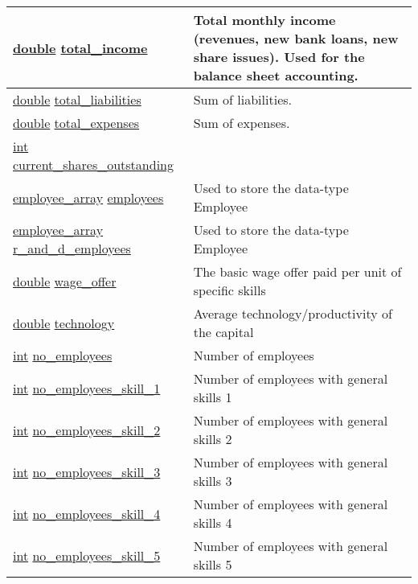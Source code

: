 \documentclass[a4paper,11pt]{article}
\begin{document}
\begin{longtable}[H!]{ll}
\midrule
\parbox{5cm}{\url{double} \url{total_income}}  & \parbox{10cm}{Total monthly income (revenues, new bank loans, new share issues). Used for the balance sheet accounting.} \\
\midrule
\parbox{5cm}{\url{double} \url{total_liabilities}}  & \parbox{10cm}{Sum of liabilities.} \\
\midrule
\parbox{5cm}{\url{double} \url{total_expenses}}  & \parbox{10cm}{Sum of expenses.} \\
\midrule
\parbox{5cm}{\url{int} \url{current_shares_outstanding}}  & \parbox{10cm}{} \\
\midrule
\parbox{5cm}{\url{employee_array} \url{employees}}  & \parbox{10cm}{Used to store the data-type Employee} \\
\midrule
\parbox{5cm}{\url{employee_array} \url{r_and_d_employees}}  & \parbox{10cm}{Used to store the data-type Employee} \\
\midrule
\parbox{5cm}{\url{double} \url{wage_offer}}  & \parbox{10cm}{The basic wage offer paid per unit of specific skills} \\
\midrule
\parbox{5cm}{\url{double} \url{technology}}  & \parbox{10cm}{Average technology/productivity of the capital} \\
\midrule
\parbox{5cm}{\url{int} \url{no_employees}}  & \parbox{10cm}{Number of employees} \\
\midrule
\parbox{5cm}{\url{int} \url{no_employees_skill_1}}  & \parbox{10cm}{Number of employees with general skills 1} \\
\midrule
\parbox{5cm}{\url{int} \url{no_employees_skill_2}}  & \parbox{10cm}{Number of employees with general skills 2} \\
\midrule
\parbox{5cm}{\url{int} \url{no_employees_skill_3}}  & \parbox{10cm}{Number of employees with general skills 3} \\
\midrule
\parbox{5cm}{\url{int} \url{no_employees_skill_4}}  & \parbox{10cm}{Number of employees with general skills 4} \\
\midrule
\parbox{5cm}{\url{int} \url{no_employees_skill_5}}  & \parbox{10cm}{Number of employees with general skills 5} \\

\end{longtable}
\end{document}
